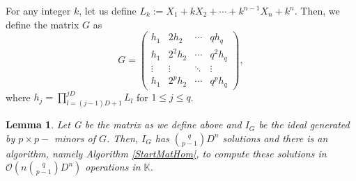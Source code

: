\documentclass[11pt]{article}
\numberwithin{Property}{section}
\numberwithin{Theorem}{section}
\numberwithin{Proposition}{section}
\newtheorem{Lemma}{Lemma}%
\numberwithin{Lemma}{section}
\numberwithin{Corollary}{section}
\numberwithin{Definition}{section}
\numberwithin{Remark}{section}
\numberwithin{Conjecture}{section}
\numberwithin{Problem}{section}
\numberwithin{Example}{section}
\numberwithin{Claim}{section}
\renewcommand{\leq}{\leqslant}
\newcommand{\bigO}[1]{\mathcal{O}(#1)} %
\newcommand{\var}{X} %
\newcommand{\field}{\mathbb{K}} %
\begin{document}
For any integer $k$, let us define $L_k := \var_1 + k\var_2 + \cdots + k^{n-1}\var_n + k^n$. Then, we define the matrix $G$ as 
\[G = 
\left( \begin{matrix}
h_1 & 2h_2 & \cdots & qh_q\\
h_1 & 2^2h_2 &\cdots & q^2h_q\\
\vdots & \vdots  & \ddots & \vdots \\
h_1 & 2^ph_2& \cdots & q^ph_q
\end{matrix} \right),
\] where $h_j = \prod_{l=(j-1)D+1}^{jD} L_{l}$ for $1 \leq j \leq q$. %
\begin{Lemma} Let G be the matrix as we define above and $I_G$ be the ideal generated by $p \times p-$ minors of $G$. Then, $I_G$ has ${q \choose {p-1}}D^n$ solutions and there is an algorithm, namely Algorithm \ref{StartMatHom}, to compute these solutions in  $\bigO{n{q \choose {p-1}}D^n}$ operations in $\field$.
 \end{Lemma}
\end{document}
